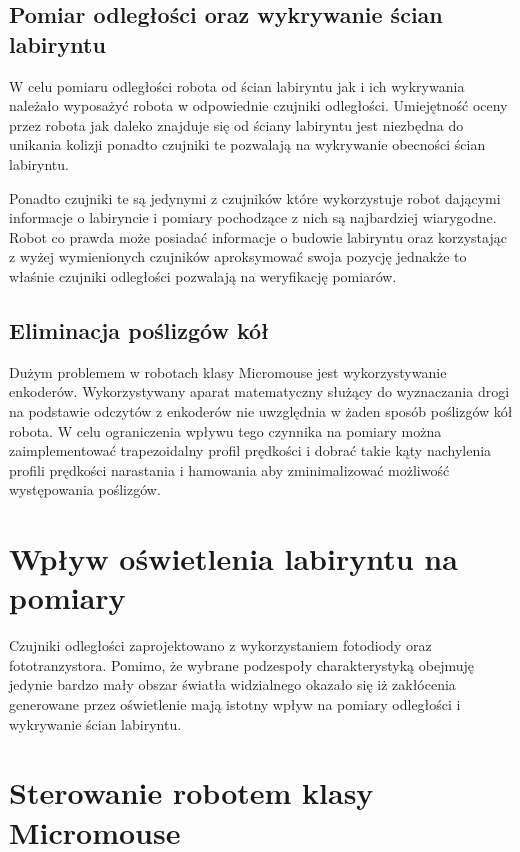 \documentclass[12pt,a4paper,twoside,openright,fleqn]{mwrep}
\begin{document}
\subsection{Pomiar odległości oraz wykrywanie ścian labiryntu} %
W celu pomiaru odległości robota od ścian labiryntu jak i ich wykrywania należało wyposażyć robota w odpowiednie czujniki odległości. Umiejętność oceny przez robota jak daleko znajduje się od ściany labiryntu jest niezbędna do unikania kolizji ponadto czujniki te pozwalają na wykrywanie obecności ścian labiryntu. 

Ponadto czujniki te są jedynymi z czujników które wykorzystuje robot dającymi informacje o labiryncie i pomiary pochodzące z nich są najbardziej wiarygodne. Robot co prawda może posiadać informacje o budowie labiryntu oraz korzystając z wyżej wymienionych czujników aproksymować swoja pozycję jednakże to właśnie czujniki odległości pozwalają na weryfikację pomiarów. 

\subsection{Eliminacja poślizgów kół} %
Dużym problemem w robotach klasy Micromouse jest wykorzystywanie enkoderów. Wykorzystywany aparat matematyczny służący do wyznaczania drogi na podstawie odczytów z enkoderów nie uwzględnia w żaden sposób poślizgów kół robota. W celu ograniczenia wpływu tego czynnika na pomiary można zaimplementować trapezoidalny profil prędkości i dobrać takie kąty nachylenia profili prędkości narastania i hamowania aby zminimalizować możliwość występowania poślizgów. 

\section{Wpływ oświetlenia labiryntu na pomiary } %

Czujniki odległości zaprojektowano z wykorzystaniem fotodiody oraz fototranzystora. Pomimo, że wybrane podzespoły charakterystyką obejmuję jedynie bardzo mały obszar światła widzialnego okazało się iż zakłócenia generowane przez oświetlenie mają istotny wpływ na pomiary odległości i wykrywanie ścian labiryntu. 

\section{Sterowanie robotem klasy Micromouse} %
\end{document}
